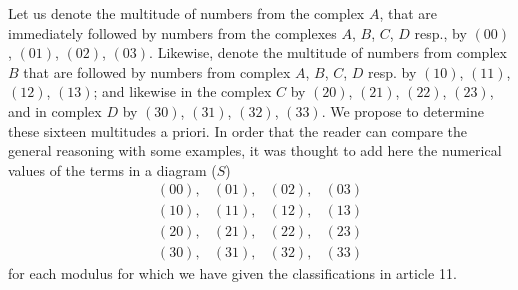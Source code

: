 \documentclass[twoside,12pt]{memoir}
\begin{document}
Let us denote the multitude of numbers from the complex \(A\), that are immediately followed by numbers from the complexes \(A\), \(B\), \(C\), \(D\) resp{.}, by \((00)\), \((01)\), \((02)\), \((03)\).  Likewise, denote the multitude of numbers from complex \(B\) that are followed by numbers from complex \(A\), \(B\), \(C\), \(D\) resp{.} by \((10)\), \((11)\), \((12)\), \((13)\); and likewise in the complex \(C\) by \((20)\), \((21)\), \((22)\), \((23)\), and in complex \(D\) by \((30)\), \((31)\), \((32)\), \((33)\). We propose to determine these sixteen multitudes a priori. In order that the reader can compare the general reasoning with some examples, it was thought to add here the numerical values of the terms in a diagram (\(S\))
\[\begin{array}{llll}
(00), & (01), & (02), & (03) \\
(10), & (11), & (12), & (13) \\
(20), & (21), & (22), & (23) \\
(30), & (31), & (32), & (33)
\end{array}\]
for each modulus for which we have given the classifications in article 11.
\end{document}
